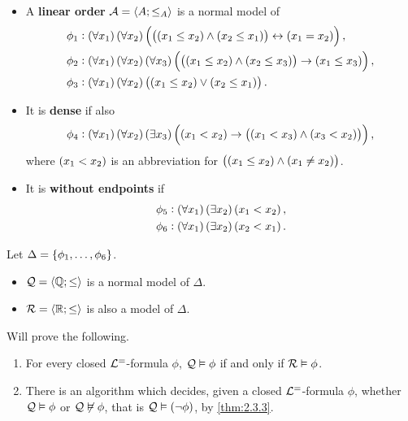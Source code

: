 \begin{definition}
\hfill
\begin{itemize}
\item A \textbf{linear order} $ \mathcal{A} = \left\langle A; \le_A \right\rangle $ is a normal model of
\begin{align*}
\phi_1 & : \fab{x_1}\fab{x_2}\iffb{\andb{\leb{x_1}{x_2}}{\leb{x_2}{x_1}}}{\eqb{x_1}{x_2}}, \\
\phi_2 & : \fab{x_1}\fab{x_2}\fab{x_3}\impb{\andb{\leb{x_1}{x_2}}{\leb{x_2}{x_3}}}{\leb{x_1}{x_3}}, \\
\phi_3 & : \fab{x_1}\fab{x_2}\orb{\leb{x_1}{x_2}}{\leb{x_2}{x_1}}.
\end{align*}
\item It is \textbf{dense} if also
$$ \phi_4 : \fab{x_1}\fab{x_2}\teb{x_3}\impb{\ltb{x_1}{x_2}}{\andb{\ltb{x_1}{x_3}}{\ltb{x_3}{x_2}}}, $$
where $ \ltb{x_1}{x_2} $ is an abbreviation for $ \andb{\leb{x_1}{x_2}}{\neb{x_1}{x_2}} $.
\item It is \textbf{without endpoints} if
\begin{align*}
\phi_5 & : \fab{x_1}\teb{x_2}\ltb{x_1}{x_2}, \\
\phi_6 & : \fab{x_1}\teb{x_2}\ltb{x_2}{x_1}.
\end{align*}
\end{itemize}
\end{definition}

\pagebreak

Let $ \Delta = \cbr{\phi_1, \dots, \phi_6} $.
\begin{itemize}
\item $ \mathcal{Q} = \left\langle \mathbb{Q}; \le \right\rangle $ is a normal model of $ \Delta $.
\item $ \mathcal{R} = \left\langle \mathbb{R}; \le \right\rangle $ is also a model of $ \Delta $.
\end{itemize}
Will prove the following.

\begin{theorem}
\label{thm:2.7.2}
\hfill
\begin{enumerate}
\item For every closed $ \mathcal{L}^= $-formula $ \phi $, $ \mathcal{Q} \vDash \phi $ if and only if $ \mathcal{R} \vDash \phi $.
\item There is an algorithm which decides, given a closed $ \mathcal{L}^= $-formula $ \phi $, whether $ \mathcal{Q} \vDash \phi $ or $ \mathcal{Q} \not\vDash \phi $, that is $ \QQQ \vDash \notb{\phi} $, by \ref{thm:2.3.3}.
\end{enumerate}
\end{theorem}

